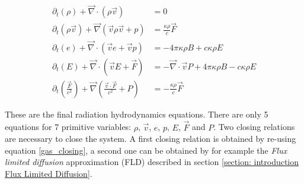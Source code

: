\begin{align}
 \partial_t \left(\rho \right) + \vec{\nabla} \cdot \left( \rho \vec{v}  \right) &= 0 \label{eq: rhd_cont} \\
 \partial_t \left(\rho \vec{v} \right) + \vec{\nabla} \left( \vec{v} \rho \vec{v} + p \right) 
 &= \frac{\kappa \rho}{c} \vec{F} \label{eq: rhd_mom} \\
 \partial_t \left(e \right) + \vec{\nabla} \cdot \left( \vec{v} e + \vec{v} p \right) &= -4\pi \kappa\rho B + c \kappa \rho E \label{eq: rhd_e}\\
 \partial_t \left(E \right) +  \vec{\nabla} \cdot \left( \vec{v} E + \vec{F} \right) &=  -\vec{\nabla} \cdot \vec{v} P + 4\pi \kappa\rho B - c \kappa \rho E \label{eq: rhd_e_r} \\
 \partial_t \left(\frac{\vec{F}}{c^2} \right) +  \vec{\nabla} \left( \frac{\vec{v} \cdot \vec{F}}{c^2} + P \right) &= - \frac{\kappa \rho}{c} \vec{F} \label{eq: rhd_flux}
\end{align}

These are the final radiation hydrodynamics equations. There are only 5 equations for 7 primitive variables: $\rho$, $\vec{v}$, $e$, $p$, $E$, $\vec{F}$ and $P$. Two closing relations are necessary to close the system. A first closing relation is obtained by re-using equation \eqref{gas_closing}, a second one can be obtained by for example the \emph{Flux limited diffusion} approximation (FLD) described in section \ref{section: introduction Flux Limited Diffusion}.


